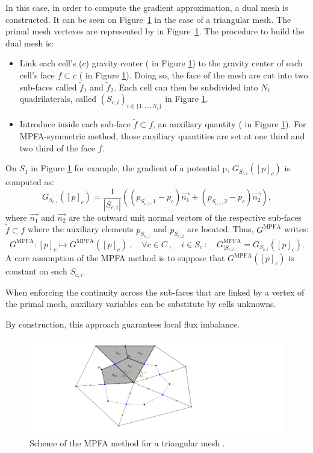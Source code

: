 In this case, in order to compute the gradient approximation, a dual mesh is constructed. It can be seen on Figure~\ref{MPFA} in the case of a triangular mesh. The primal mesh vertexes are represented by \textcolor{red}{\textbullet} in Figure~\ref{MPFA}. The procedure to build the dual mesh is:
\begin{itemize}
    \item Link each cell's ($c$) gravity center (\textcolor{black}{\textbullet} in Figure \ref{MPFA}) to the gravity center of each cell's face $f \subset c$ (\textcolor{Blue}{\textbullet} in Figure \ref{MPFA}). Doing so, the face of the mesh are cut into two sub-faces called $\tilde{f}_1$ and $\tilde{f}_2$. Each cell can then be subdivided into $N_i$ quadrilaterals, called $(S_{c,i})_{i\in\{ 1,\dots, N_i \} } $ in Figure \ref{MPFA}.
    \item Introduce inside each sub-face $\tilde{f} \subset f$, an auxiliary quantity (\textcolor{Green}{\textbullet} in Figure \ref{MPFA}). For MPFA-symmetric method, those auxiliary quantities are set at one third and two third of the face $f$.
\end{itemize}
\noindent  On $S_1$ in Figure \ref{MPFA} for example, the gradient of a potential p, $G_{S_{c,i}}([p]_c)$ is computed as:
\begin{equation}
    G_{S_{c,i}}([p]_c) = \frac{1}{|S_{c,i}|} ( (p_{S_{c,1},1} -p_c)  \vec{n_1} + (p_{S_{c,1},2} -p_c)  \vec{n_2} ),
\end{equation}
where $\vec{n_1}$ and $\vec{n_2}$ are the outward unit normal vectors of the respective sub-faces $\tilde{f}\subset f$ where the auxiliary elements $p_{S_{c,1}}$ and $p_{S_{c,2}}$ are located.
Thus, $G^{\text{MPFA}}$ writes:
\begin{equation}
    G^{\text{MPFA}}: [p]_c \mapsto G^{\text{MPFA}}([p]_c) \ , \quad \forall c \in C \ , \quad i \in S_c \ : \quad G^{\text{MPFA}} _{|S_{c,i}} =  G_{S_{c,i}}([p]_c).
\end{equation}
A core assumption of the MPFA method is to suppose that $G^{\text{MPFA}}([p]_c)$ is constant on each $S_{c,i}$. 

When enforcing the continuity across the sub-faces that are linked by a vertex of the primal mesh, auxiliary variables can be substitute by cells unknowns. 

By construction, this approach guarantees local flux imbalance.
\begin{figure}
\includegraphics[scale=0.2]{Figure/MPFAPolymac1.pdf}
\caption{Scheme of the MPFA method for a triangular mesh \cite{Bacq}.}
\label{MPFA}
\end{figure}

